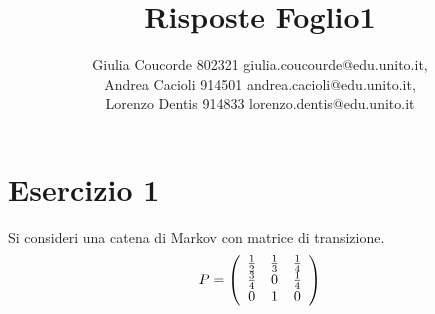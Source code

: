 \documentclass[a4paper]{article}
\begin{document}
\author{Giulia Coucorde 802321 giulia.coucourde@edu.unito.it,\\ Andrea Cacioli 914501 andrea.cacioli@edu.unito.it,\\ Lorenzo Dentis 914833 lorenzo.dentis@edu.unito.it}
\title{Risposte Foglio1}
\maketitle
\section{Esercizio 1}
Si consideri una catena di Markov con matrice di transizione.
$$P=\left(\begin{array}{c c c}{{\frac{1}{2}}}&{{\frac{1}{3}}}&{{\frac{1}{4}}}\\ {{\frac{3}{4}}}&{{0}}&{{\frac{1}{4}}}\\ {{0}}&{{1}}&{{0}}\end{array}\right)$$
\end{document}
